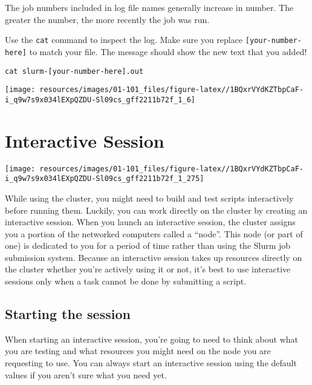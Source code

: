 \documentclass[
]{book}
\begin{document}
The job numbers included in log file names generally increase in number. The greater the number, the more recently the job was run.

Use the \texttt{cat} command to inspect the log. Make sure you replace \texttt{{[}your-number-here{]}} to match your file. The message should show the new text that you added!

\begin{verbatim}
cat slurm-[your-number-here].out
\end{verbatim}

\texttt{[image: resources/images/01-101\_files/figure-latex//1BQxrVYdKZTbpCaF-i\_q9w7s9x034lEXpQZDU-Sl09cs\_gff2211b72f\_1\_6]}

\hypertarget{interactive-session}{%
\chapter{Interactive Session}\label{interactive-session}}

\begin{center}\texttt{[image: resources/images/01-101\_files/figure-latex//1BQxrVYdKZTbpCaF-i\_q9w7s9x034lEXpQZDU-Sl09cs\_gff2211b72f\_1\_275]} \end{center}

While using the cluster, you might need to build and test scripts interactively before running them. Luckily, you can work directly on the cluster by creating an interactive session. When you launch an interactive session, the cluster assigns you a portion of the networked computers called a ``node''. This node (or part of one) is dedicated to you for a period of time rather than using the Slurm job submission system. Because an interactive session takes up resources directly on the cluster whether you're actively using it or not, it's best to use interactive sessions only when a task cannot be done by submitting a script.

\hypertarget{starting-the-session}{%
\section{Starting the session}\label{starting-the-session}}

When starting an interactive session, you're going to need to think about what you are testing and what resources you might need on the node you are requesting to use. You can always start an interactive session using the default values if you aren't sure what you need yet.
\end{document}
